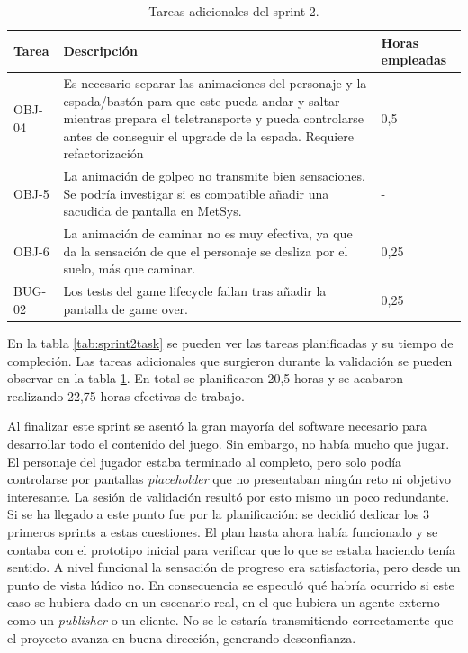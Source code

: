 \begin{table}[!ht]
    \centering
    \begin{tabular}{|l|p{8cm}|l|}
    \hline
        Tarea & Descripción & Horas empleadas \\ \hline
        OBJ-04 & Es necesario separar las animaciones del personaje y la espada/bastón para que este pueda andar y saltar mientras prepara el teletransporte y pueda controlarse antes de conseguir el upgrade de la espada. Requiere refactorización & 0,5 \\ \hline
        OBJ-5 & La animación de golpeo no transmite bien sensaciones. Se podría investigar si es compatible añadir una sacudida de pantalla en MetSys. & - \\ \hline
        OBJ-6 & La animación de caminar no es muy efectiva, ya que da la sensación de que el personaje se desliza por el suelo, más que caminar. & 0,25 \\ \hline
        BUG-02 & Los tests del game lifecycle fallan tras añadir la pantalla de game over. & 0,25 \\ \hline
    \end{tabular}
    \caption{Tareas adicionales del sprint 2.}
    \label{tab:aditionalsprint2task}
\end{table}

En la tabla \ref{tab:sprint2task} se pueden ver las tareas planificadas y su tiempo de compleción. Las tareas adicionales que surgieron durante la validación se pueden observar en la tabla \ref{tab:aditionalsprint2task}. En total se planificaron 20,5 horas y se acabaron realizando 22,75 horas efectivas de trabajo.

Al finalizar este sprint se asentó la gran mayoría del software necesario para desarrollar todo el contenido del juego. Sin embargo, no había mucho que jugar. El personaje del jugador estaba terminado al completo, pero solo podía controlarse por pantallas \textit{placeholder} que no presentaban ningún reto ni objetivo interesante. La sesión de validación resultó por esto mismo un poco redundante. Si se ha llegado a este punto fue por la planificación: se decidió dedicar los 3 primeros sprints a estas cuestiones. El plan hasta ahora había funcionado y se contaba con el prototipo inicial para verificar que lo que se estaba haciendo tenía sentido. A nivel funcional la sensación de progreso era satisfactoria, pero desde un punto de vista lúdico no. En consecuencia se especuló qué habría ocurrido si este caso se hubiera dado en un escenario real, en el que hubiera un agente externo como un \textit{publisher} o un cliente. No se le estaría transmitiendo correctamente que el proyecto avanza en buena dirección, generando desconfianza.

